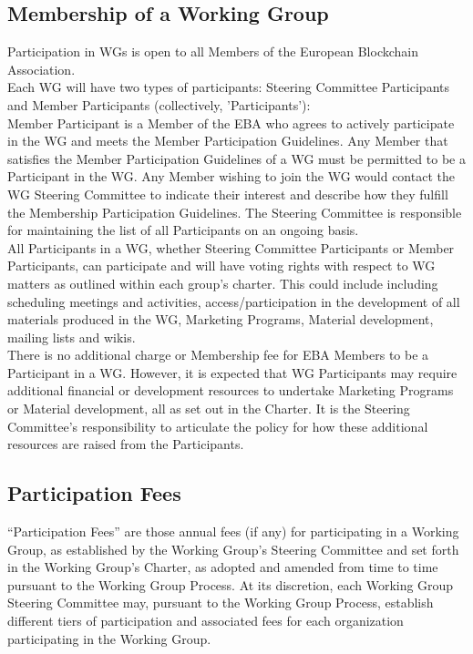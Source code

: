 \documentclass{article}
\begin{document}
\subsection{Membership of a Working Group}

Participation in WGs is open to all Members of the European Blockchain Association. \\
Each WG will have two types of participants: Steering Committee Participants and Member Participants (collectively, 'Participants'): \\
Member Participant is a Member of the EBA who agrees to actively participate in the WG and meets the Member Participation Guidelines. 
Any Member that satisfies the Member Participation Guidelines of a WG must be permitted to be a Participant in the WG. 
Any Member wishing to join the WG would contact the WG Steering Committee to indicate their interest and describe how they fulfill the Membership Participation Guidelines. 
The Steering Committee is responsible for maintaining the list of all Participants on an ongoing basis. \\
All Participants in a WG, whether Steering Committee Participants or Member Participants, can participate and will have voting rights with respect to WG matters as outlined within each group's charter. 
This could include including scheduling meetings and activities, access/participation in the development of all materials produced in the WG, Marketing Programs, Material development, mailing lists and wikis. \\
There is no additional charge or Membership fee for EBA Members to be a Participant in a WG. 
However, it is expected that WG Participants may require additional financial or development resources to undertake Marketing Programs or Material development, all as set out in the Charter. 
It is the Steering Committee's responsibility to articulate the policy for how these additional resources are raised from the Participants.

\subsection{Participation Fees}

“Participation Fees” are those annual fees (if any) for participating in a Working Group, as established by the Working Group's Steering Committee and set forth in the Working Group's Charter, as adopted and amended from time to time pursuant to the Working Group Process. 
At its discretion, each Working Group Steering Committee may, pursuant to the Working Group Process, establish different tiers of participation and associated fees for each organization participating in the Working Group.
\end{document}
